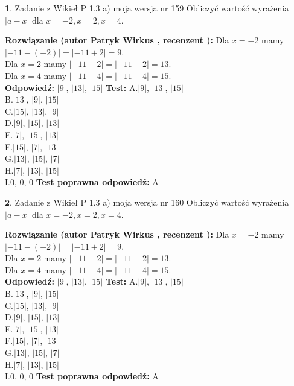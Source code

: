 \documentclass[12pt, a4paper]{article}
\theoremstyle{definition} %
\newtheorem{zad}{}
\newcommand{\zadStart}[1]{\begin{zad}#1\newline}
\newcommand{\zadStop}{\end{zad}}
\newcommand{\rozwStart}[2]{\noindent \textbf{Rozwiązanie (autor #1 , recenzent #2): }\newline}
\newcommand{\rozwStop}{\newline}
\newcommand{\odpStart}{\noindent \textbf{Odpowiedź:}\newline}
\newcommand{\odpStop}{\newline}
\newcommand{\testStart}{\noindent \textbf{Test:}\newline}
\newcommand{\testStop}{\newline}
\newcommand{\kluczStart}{\noindent \textbf{Test poprawna odpowiedź:}\newline}
\newcommand{\kluczStop}{\newline}
\begin{document}
\zadStart{Zadanie z Wikieł P 1.3 a) moja wersja nr 159}
Obliczyć wartość wyrażenia $|a - x|$ dla $x=-2,x=2,x=4$.
\zadStop
\rozwStart{Patryk Wirkus}{}
Dla $x = -2$ mamy $|-11 - (-2)| = |-11 + 2| = 9$.\\
Dla $x = 2$ mamy $|-11 - 2| = |-11 - 2| = 13$.\\
Dla $x = 4$ mamy $|-11 - 4| = |-11 - 4| = 15$.\\
\rozwStop
\odpStart
$|9|$, $|13|$, $|15|$
\odpStop
\testStart
A.$|9|$, $|13|$, $|15|$\\
B.$|13|$, $|9|$, $|15|$\\
C.$|15|$, $|13|$, $|9|$\\
D.$|9|$, $|15|$, $|13|$\\
E.$|7|$, $|15|$, $|13|$\\
F.$|15|$, $|7|$, $|13|$\\
G.$|13|$, $|15|$, $|7|$\\
H.$|7|$, $|13|$, $|15|$\\
I.$0$, $0$, $0$
\testStop
\kluczStart
A
\kluczStop



\zadStart{Zadanie z Wikieł P 1.3 a) moja wersja nr 160}
Obliczyć wartość wyrażenia $|a - x|$ dla $x=-2,x=2,x=4$.
\zadStop
\rozwStart{Patryk Wirkus}{}
Dla $x = -2$ mamy $|-11 - (-2)| = |-11 + 2| = 9$.\\
Dla $x = 2$ mamy $|-11 - 2| = |-11 - 2| = 13$.\\
Dla $x = 4$ mamy $|-11 - 4| = |-11 - 4| = 15$.\\
\rozwStop
\odpStart
$|9|$, $|13|$, $|15|$
\odpStop
\testStart
A.$|9|$, $|13|$, $|15|$\\
B.$|13|$, $|9|$, $|15|$\\
C.$|15|$, $|13|$, $|9|$\\
D.$|9|$, $|15|$, $|13|$\\
E.$|7|$, $|15|$, $|13|$\\
F.$|15|$, $|7|$, $|13|$\\
G.$|13|$, $|15|$, $|7|$\\
H.$|7|$, $|13|$, $|15|$\\
I.$0$, $0$, $0$
\testStop
\kluczStart
A
\kluczStop
\end{document}
